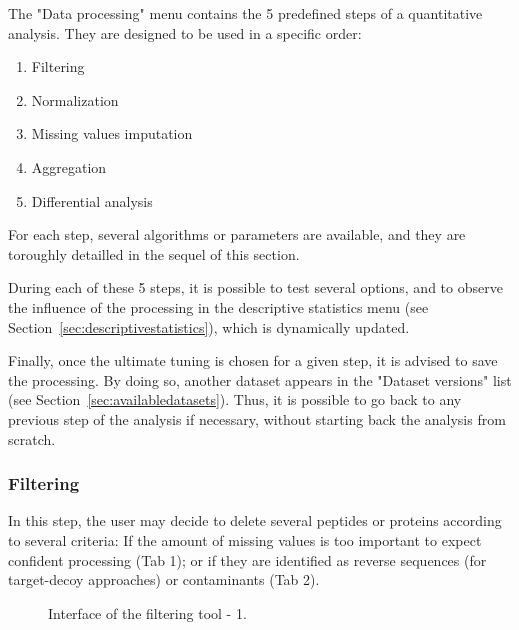 \documentclass[12pt]{article}
\begin{document}
The "Data processing" menu contains the 5 predefined steps of a quantitative 
analysis. They are designed to be used in a specific order:
\begin{enumerate}
\item {Filtering}
\item{Normalization}
\item{Missing values imputation}
\item{Aggregation}
\item{Differential analysis}
\end{enumerate}
For each step, several algorithms or parameters are available, and they are 
toroughly detailled in the sequel of this section.

During each of these 5 steps, it is possible to test several options, and to 
observe the influence of the processing in the descriptive statistics menu 
(see Section~\ref{sec:descriptivestatistics}), which is dynamically updated. 

Finally, once the ultimate tuning is chosen for a given step, it is advised 
to save the processing. By doing so, another dataset appears in the "Dataset 
versions" list (see Section~\ref{sec:availabledatasets}). Thus, it is possible 
to go back to any previous step of the analysis if necessary, without starting 
back the analysis from scratch.

\subsubsection{Filtering}\label{sec:filtering}
{In this step, the user may decide to delete several peptides or proteins 
according to several criteria:
If the amount of missing values is too important to expect confident 
processing (Tab 1); or if they are identified as reverse sequences (for 
target-decoy approaches) or contaminants (Tab 2).}

\begin {figure}
\centering
{}
\caption{Interface of the filtering tool - 1.}\label{fig:filter1}
\end {figure}
\end{document}
